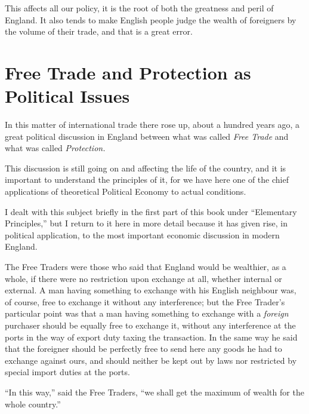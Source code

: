 \documentclass{book}
\begin{document}
This affects all our policy, it is the root of both the greatness and peril of England. It also tends to make English people judge the wealth of foreigners by the volume of their trade, and that is a great error.

\chapter*{Free Trade and Protection as Political Issues}
\label{chapter-16}
In this matter of international trade there rose up, about a hundred years ago, a great political discussion in England between what was called \emph{Free Trade} and what was called \emph{Protection.}

This discussion is still going on and affecting the life of the country, and it is important to understand the principles of it, for we have here one of the chief applications of theoretical Political Economy to actual conditions.

I dealt with this subject briefly in the first part of this book under “Elementary Principles,” but I return to it here in more detail because it has given rise, in political application, to the most important economic discussion in modern England.

The Free Traders were those who said that England would be wealthier, as a whole, if there were no restriction upon exchange at all, whether internal or external. A man having something to exchange with his English neighbour was, of course, free to exchange it without any interference; but the Free Trader’s particular point was that a man having something to exchange with a \emph{foreign} purchaser should be equally free to exchange it, without any interference at the ports in the way of export duty taxing the transaction. In the same way he said that the foreigner should be perfectly free to send here any goods he had to exchange against ours, and should neither be kept out by laws nor restricted by special import duties at the ports.

“In this way,” said the Free Traders, “we shall get the maximum of wealth for the whole country.”
\end{document}
